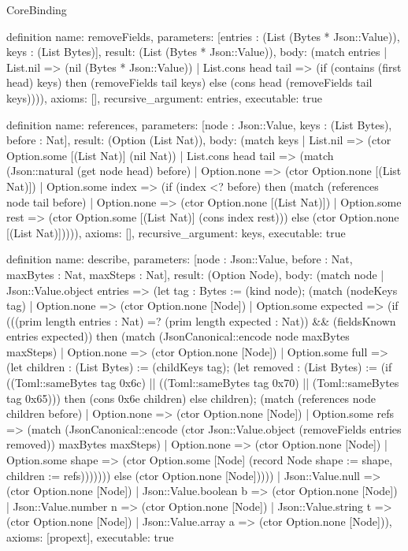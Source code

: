 \begin{lexlean}{CoreBinding}
\begin{semanticmodule}
definition{
 name: removeFields,
 parameters: [entries : (List (Bytes * Json::Value)), keys : (List Bytes)],
 result: (List (Bytes * Json::Value)),
 body: (match entries | List.nil => (nil (Bytes * Json::Value)) | List.cons head tail => (if (contains (first head) keys) then (removeFields tail keys) else (cons head (removeFields tail keys)))),
 axioms: [],
 recursive_argument: entries,
 executable: true
}

definition{
 name: references,
 parameters: [node : Json::Value, keys : (List Bytes), before : Nat],
 result: (Option (List Nat)),
 body: (match keys | List.nil => (ctor Option.some [(List Nat)] (nil Nat)) | List.cons head tail => (match (Json::natural (get node head) before) | Option.none => (ctor Option.none [(List Nat)]) | Option.some index => (if (index <? before) then (match (references node tail before) | Option.none => (ctor Option.none [(List Nat)]) | Option.some rest => (ctor Option.some [(List Nat)] (cons index rest))) else (ctor Option.none [(List Nat)])))),
 axioms: [],
 recursive_argument: keys,
 executable: true
}

definition{
 name: describe,
 parameters: [node : Json::Value, before : Nat, maxBytes : Nat, maxSteps : Nat],
 result: (Option Node),
 body: (match node | Json::Value.object entries => (let tag : Bytes := (kind node); (match (nodeKeys tag) | Option.none => (ctor Option.none [Node]) | Option.some expected => (if (((prim length entries : Nat) =? (prim length expected : Nat)) && (fieldsKnown entries expected)) then (match (JsonCanonical::encode node maxBytes maxSteps) | Option.none => (ctor Option.none [Node]) | Option.some full => (let children : (List Bytes) := (childKeys tag); (let removed : (List Bytes) := (if ((Toml::sameBytes tag 0x6c) || ((Toml::sameBytes tag 0x70) || (Toml::sameBytes tag 0x65))) then (cons 0x6e children) else children); (match (references node children before) | Option.none => (ctor Option.none [Node]) | Option.some refs => (match (JsonCanonical::encode (ctor Json::Value.object (removeFields entries removed)) maxBytes maxSteps) | Option.none => (ctor Option.none [Node]) | Option.some shape => (ctor Option.some [Node] (record Node {shape := shape, children := refs}))))))) else (ctor Option.none [Node])))) | Json::Value.null => (ctor Option.none [Node]) | Json::Value.boolean b => (ctor Option.none [Node]) | Json::Value.number n => (ctor Option.none [Node]) | Json::Value.string t => (ctor Option.none [Node]) | Json::Value.array a => (ctor Option.none [Node])),
 axioms: [propext],
 executable: true
}


\end{semanticmodule}
\end{lexlean}
